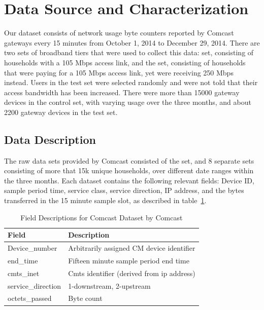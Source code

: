 \section{Data Source and Characterization}
\label{sec:data}
Our dataset consists of network usage byte counters reported by Comcast gateways 
every 15 minutes from October 1, 2014 to December 29, 2014. There are two sets 
of broadband tiers that were used to collect this data: \control set, consisting 
of households with a 105 Mbps access link, and the \test set, consisting of 
households that were paying for a 105 Mbps access link, yet were receiving 250 
Mbps instead. Users in the test set were selected randomly and were not told 
that their access bandwidth has been increased. There were more than 15000 
gateway devices in the control set, with varying usage over the three months, 
and about 2200 gateway devices in the test set.


\subsection{Data Description}
\label{subsec:data-description}

The raw data sets provided by Comcast consisted of the \test set, and 8 separate 
\control sets consisting of more that 15k unique households, over different 
date ranges within the three months. Each dataset contains the following 
relevant fields: Device ID, sample period time, service class, service 
direction, IP address, and the bytes transferred in the 15 minute sample slot, 
as described in table~\ref{tab:field-description}.

\begin{table}[ht!]
\small
\begin{tabular}{|l|l|}
\hline
\textbf{Field}         & \textbf{Description}                      \\ \hline
Device\_number         & Arbitrarily assigned CM device identifier \\ \hline
end\_time              & Fifteen minute sample period end time     \\ \hline
cmts\_inet             & Cmts identifier (derived from ip address) \\ \hline
service\_direction     & 1-downstream, 2-upstream                  \\ \hline
octets\_passed         & Byte count                                \\ \hline
\end{tabular}
\caption{Field Descriptions for Comcast Dataset by Comcast}
\label{tab:field-description}
\end{table}

